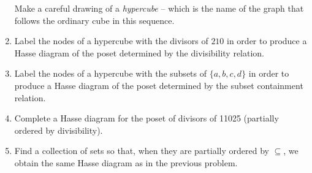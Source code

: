 \begin{enumerate}
\begin{center}

\end{center}

Make a careful drawing of a \emph{hypercube} -- which is
the name of the graph that follows the ordinary cube in this sequence.

\wbvfill

\workbookpagebreak

\item Label the nodes of a hypercube with the divisors of $210$ in order to
produce a Hasse diagram of the poset determined by the divisibility relation.

\wbvfill


\item Label the nodes of a hypercube with the subsets of $\{a,b,c,d\}$ 
in order to produce a Hasse diagram of the poset determined by the 
subset containment relation.

\wbvfill

\workbookpagebreak

\item Complete a Hasse diagram for the poset of divisors of 11025 (partially ordered by divisibility).

\wbvfill


\item Find a collection of sets so that, when they are partially ordered by $\subseteq$, we obtain the same Hasse diagram as in the previous problem.

\wbvfill

\workbookpagebreak


\end{enumerate}


